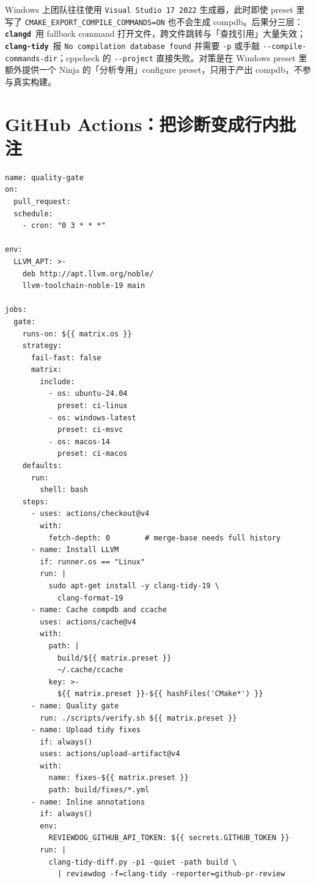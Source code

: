\documentclass[12pt,a4paper,fontset=fandol]{ctexbook}
\newcommand{\Opt}[1]{\texttt{-\/-#1}}
\newcommand{\Lib}[1]{\textbf{\texttt{#1}}}
\newcommand{\Tidy}{\Lib{clang-tidy}}
\newcommand{\CD}{\Lib{clangd}}
\begin{document}
\begin{warning}[title={VS 生成器下 compdb 缺失导致的静默降级}]
Windows 上团队往往使用 \texttt{Visual Studio 17 2022} 生成器，此时即使 preset 里写了 \texttt{CMAKE\_EXPORT\_COMPILE\_COMMANDS=ON} 也不会生成 compdb。后果分三层：\CD\ 用 fallback command 打开文件，跨文件跳转与「查找引用」大量失效；\Tidy\ 报 \texttt{No compilation database found} 并需要 \texttt{-p} 或手敲 \Opt{compile-commands-dir}；cppcheck 的 \Opt{project} 直接失败。对策是在 Windows preset 里额外提供一个 Ninja 的「分析专用」configure preset，只用于产出 compdb，不参与真实构建。
\end{warning}

\section{GitHub Actions：把诊断变成行内批注}\label{sec:ch16-s9}

\begin{lstlisting}[style=yamlstyle,caption={quality-gate 工作流：矩阵、缓存与行内批注},label={lst:ch16-actions}]
name: quality-gate
on:
  pull_request:
  schedule:
    - cron: "0 3 * * *"

env:
  LLVM_APT: >-
    deb http://apt.llvm.org/noble/
    llvm-toolchain-noble-19 main

jobs:
  gate:
    runs-on: ${{ matrix.os }}
    strategy:
      fail-fast: false
      matrix:
        include:
          - os: ubuntu-24.04
            preset: ci-linux
          - os: windows-latest
            preset: ci-msvc
          - os: macos-14
            preset: ci-macos
    defaults:
      run:
        shell: bash
    steps:
      - uses: actions/checkout@v4
        with:
          fetch-depth: 0        # merge-base needs full history
      - name: Install LLVM
        if: runner.os == "Linux"
        run: |
          sudo apt-get install -y clang-tidy-19 \
            clang-format-19
      - name: Cache compdb and ccache
        uses: actions/cache@v4
        with:
          path: |
            build/${{ matrix.preset }}
            ~/.cache/ccache
          key: >-
            ${{ matrix.preset }}-${{ hashFiles('CMake*') }}
      - name: Quality gate
        run: ./scripts/verify.sh ${{ matrix.preset }}
      - name: Upload tidy fixes
        if: always()
        uses: actions/upload-artifact@v4
        with:
          name: fixes-${{ matrix.preset }}
          path: build/fixes/*.yml
      - name: Inline annotations
        if: always()
        env:
          REVIEWDOG_GITHUB_API_TOKEN: ${{ secrets.GITHUB_TOKEN }}
        run: |
          clang-tidy-diff.py -p1 -quiet -path build \
            | reviewdog -f=clang-tidy -reporter=github-pr-review
\end{lstlisting}
\end{document}
